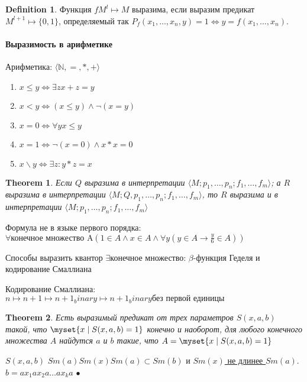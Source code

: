 \documentclass[a4paper]{article}
\theoremstyle{plain}
\newtheorem{theorem}{Theorem}
\theoremstyle{remark}
\theoremstyle{definition}
\newtheorem{definition}{Definition}
\renewenvironment{proof}{{\bfseries Proof}}{$\bullet$}
\newcommand{\bra}[1]{\langle #1 \rangle}
\newcommand{\mysetso}[2]{\myset{#1 \mid #2}}
\begin{document}
\begin{definition}
	Функция $f M^l \mapsto M$ выразима, если выразим предикат $M^{l + 1} \mapsto \{0,1\}$, определяемый так $P_f(x_1, \ldots, x_n, y) = 1 \Leftrightarrow y = f(x_1, \ldots, x_n)$. 
\end{definition}

\paragraph{Выразимость в арифметике}
Арифметика: $\bra{\mathbb{N}, =, *, +}$
\begin{enumerate}
	\item $x \leq y \Leftrightarrow \exists{z} x + z = y$ 
	\item $x < y \Leftrightarrow (x \leq y) \land \lnot (x = y)$
	\item $x = 0 \Leftrightarrow \forall{y} x \leq y$
	\item $x = 1 \Leftrightarrow \lnot(x = 0) \land x * x = 0$
	\item $x \backslash y \Leftrightarrow \exists{z}: y * z = x$
\end{enumerate}

\begin{theorem}
	Если $Q$ выразима в интерпретации $\bra{M; p_1, \ldots, p_n; f_1, \ldots, f_m}$; а $R$ выразима в интерпретации $\bra{M; Q, p_1, \ldots, p_n; f_1, \ldots, f_m}$, то $R$ выразима и в интерпретации $\bra{M; p_1, \ldots, p_n; f_1, \ldots, f_m}$
\end{theorem}

Формула не в языке первого порядка: $\forall{\text{конечное множество A}}(1 \in A \land x \in A \land \forall{y}(y \in A \rightarrow \frac{y}{6} \in A))$

Способы выразить квантор $\exists{\text{конечное множество}}$: $\beta$-функция Геделя и кодирование Смаллиана

Кодирование Смаллиана: $n \mapsto n + 1 \mapsto {n + 1}_binary \mapsto {n + 1}_binary \text{без первой единицы}$

\begin{theorem}
	Есть выразимый предикат от трех параметров $S(x,a,b)$ такой, что $\mysetso{x}{S(x,a,b) = 1}$ конечно и наоборот, для любого конечного множества $A$ найдутся $a$ и $b$ такие, что $A = \mysetso{x}{S(x,a,b) = 1}$
\end{theorem}

\begin{proof}
	$S(x,a,b)$ $Sm(a)Sm(x)Sm(a)\subset Sm(b)$ и \underline{$Sm(x)$ не длинее $Sm(a)$}. \newline
	$b = ax_1ax_2a\ldots ax_ka$	
\end{proof}
\end{document}
